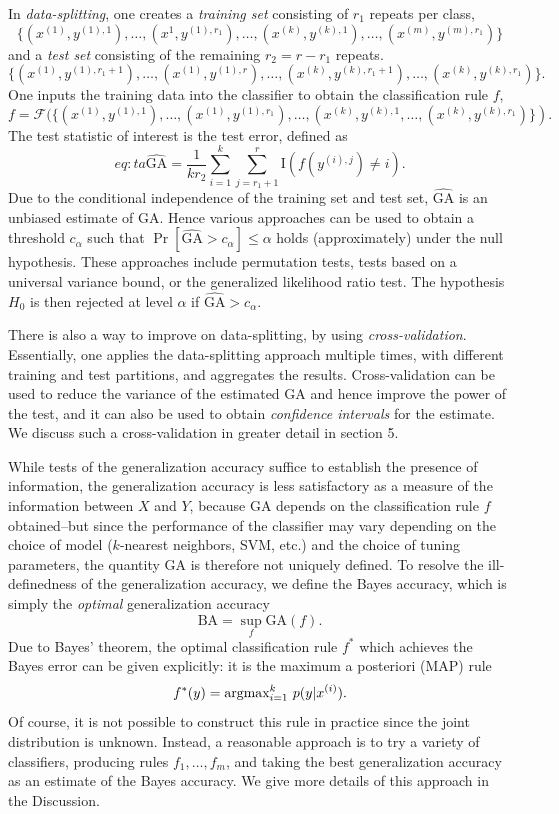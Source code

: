 \documentclass[12pt]{article}
\begin{document}
In \emph{data-splitting}, one creates a \emph{training set} consisting
of $r_1$ repeats per class,
\[
\{(x^{(1)}, y^{(1),1}),\hdots, (x^1,y^{(1), r_1}), \hdots, (x^{(k)}, y^{(k),1}),\hdots, (x^{(m)},y^{(m), r_1})\}
\]
and a \emph{test set} consisting of the remaining $r_2 = r - r_1$
repeats.
\[
\{(x^{(1)}, y^{(1), r_1 + 1}),\hdots, (x^{(1)},y^{(1),r}), \hdots, (x^{(k)}, y^{(k), r_1 + 1}),\hdots, (x^{(k)},y^{(k),r_1})\}.
\]
One inputs the training data into the classifier to obtain the
classification rule $f$,
\[
f = \mathcal{F}(\{(x^{(1)}, y^{(1),1}),\hdots,
(x^{(1)},y^{(1),r_1}), \hdots, (x^{(k)}, y^{(k),1},\hdots,
(x^{(k)},y^{(k), r_1})\}).
\]
The test statistic of interest is the test error, defined as
\begin{equation}{eq:ta}
\widehat{\text{GA}} = \frac{1}{k r_2} \sum_{i=1}^k \sum_{j = r_1 + 1}^r \text{I}(f(y^{(i),j}) \neq i).
\end{equation}
Due to the conditional independence of the training set and test set,
$\widehat{\text{GA}}$ is an unbiased estimate of $\text{GA}$.  Hence various
approaches can be used to obtain a threshold $c_\alpha$ such that
$\Pr[\widehat{\text{GA}} > c_\alpha] \leq \alpha$ holds (approximately) under the
null hypothesis.  These approaches include permutation tests, tests
based on a universal variance bound, or the generalized likelihood
ratio test.  The hypothesis $H_0$ is then rejected at level $\alpha$
if $\widehat{\text{GA}} > c_\alpha$.

There is also a way to improve on data-splitting, by
using \emph{cross-validation}. Essentially, one applies the
data-splitting approach multiple times, with different training and
test partitions, and aggregates the results. Cross-validation can be
used to reduce the variance of the estimated $\text{GA}$ and hence
improve the power of the test, and it can also be used to
obtain \emph{confidence intervals} for the estimate.  We discuss such
a cross-validation in greater detail in section 5.

While tests of the generalization accuracy suffice to establish the
presence of information, the generalization accuracy is less
satisfactory as a measure of the information between $X$ and $Y$,
because $\text{GA}$ depends on the classification rule $f$
obtained--but since the performance of the classifier may vary
depending on the choice of model ($k$-nearest neighbors, SVM, etc.)
and the choice of tuning parameters, the quantity $\text{GA}$ is
therefore not uniquely defined.  To resolve the ill-definedness of the
generalization accuracy, we define the Bayes accuracy, which is simply
the \emph{optimal} generalization accuracy
\[
\text{BA} = \sup_f \text{GA}(f).
\]
Due to Bayes' theorem, the optimal classification rule $f^*$ which
achieves the Bayes error can be given explicitly: it is the maximum a
posteriori (MAP) rule
\[
f^*(y) = \text{argmax}_{i=1}^k\ p(y|x^{(i)}).
\]
Of course, it is not possible to construct this rule in practice since
the joint distribution is unknown.  Instead, a reasonable approach is
to try a variety of classifiers, producing rules $f_1,\hdots, f_m$,
and taking the best generalization accuracy as an estimate of the Bayes
accuracy.  We give more details of this approach in the Discussion.
\end{document}
